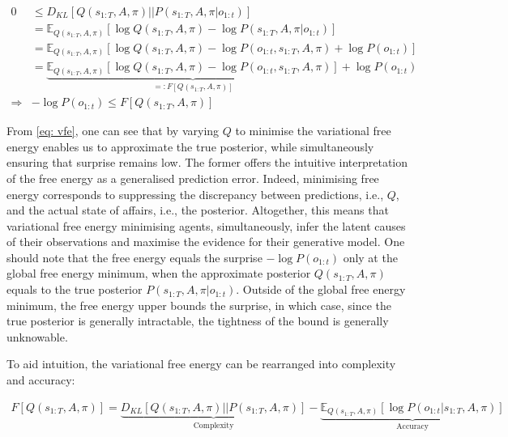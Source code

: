 \documentclass[review,12pt,authoryear]{elsarticle}
\newcommand{\E}{\mathbb E}
\begin{document}
  	\begin{equation}
  	\label{eq: vfe}
  	    \begin{split}
  	        0 &\leq D_{KL}[Q(s_{1:T}, A, \pi)||P(s_{1:T}, A, \pi |o_{1:t})] \\
  	        &= \E_{Q(s_{1:T}, A, \pi)}[\log Q(s_{1:T}, A, \pi) - \log P(s_{1:T}, A, \pi |o_{1:t})] \\
  	        &= \E_{Q(s_{1:T}, A, \pi)}[\log Q(s_{1:T}, A, \pi) - \log P(o_{1:t},s_{1:T}, A, \pi) + \log P(o_{1:t})] \\
  	        &= \underbrace{\E_{Q(s_{1:T}, A, \pi)}[\log Q(s_{1:T}, A, \pi) - \log P(o_{1:t},s_{1:T}, A, \pi)]}_{=:F[Q(s_{1:T}, A, \pi)]} + \log P(o_{1:t}) \\
  	        \Rightarrow & -\log P(o_{1:t}) \leq F[Q(s_{1:T}, A, \pi)]
  	    \end{split}
  	\end{equation}
  	
From \eqref{eq: vfe}, one can see that by varying $Q$ to minimise the variational free energy enables us to approximate the true posterior, while simultaneously ensuring that surprise remains low. The former offers the intuitive interpretation of the free energy as a generalised prediction error. Indeed, minimising free energy corresponds to suppressing the discrepancy between predictions, i.e., $Q$, and the actual state of affairs, i.e., the posterior. Altogether, this means that variational free energy minimising agents, simultaneously, infer the latent causes of their observations and maximise the evidence for their generative model. One should note that the free energy equals the surprise $-\log P(o_{1:t})$ only at the global free energy minimum, when the approximate posterior $Q(s_{1:T}, A, \pi)$ equals to the true posterior $P(s_{1:T}, A, \pi |o_{1:t})$. Outside of the global free energy minimum, the free energy upper bounds the surprise, in which case, since the true posterior is generally intractable, the tightness of the bound is generally unknowable.

To aid intuition, the variational free energy can be rearranged into complexity and accuracy:

  	\begin{multline}
  	\label{eq: complexity accuracy}
  	    F[Q(s_{1:T}, A, \pi)] = \underbrace{D_{KL}[Q(s_{1:T}, A, \pi)||P(s_{1:T}, A, \pi)]}_{\text{Complexity}}-\underbrace{\E_{Q(s_{1:T}, A, \pi)}[\log P(o_{1:t}|s_{1:T}, A, \pi)]}_{\text{Accuracy}}
  	\end{multline}
  	
\end{document}
